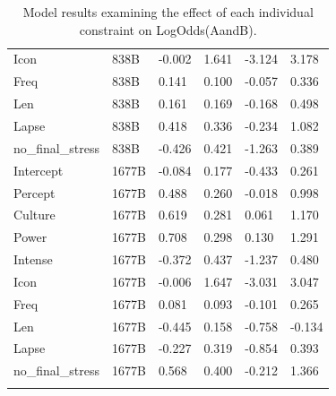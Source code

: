 \documentclass[
  nottoc]{article}
\begin{document}
\begin{longtable}[]{@{}llllll@{}}
Icon & 838B & -0.002 & 1.641 & -3.124 & 3.178 \\
Freq & 838B & 0.141 & 0.100 & -0.057 & 0.336 \\
Len & 838B & 0.161 & 0.169 & -0.168 & 0.498 \\
Lapse & 838B & 0.418 & 0.336 & -0.234 & 1.082 \\
no\_final\_stress & 838B & -0.426 & 0.421 & -1.263 & 0.389 \\
Intercept & 1677B & -0.084 & 0.177 & -0.433 & 0.261 \\
Percept & 1677B & 0.488 & 0.260 & -0.018 & 0.998 \\
Culture & 1677B & 0.619 & 0.281 & 0.061 & 1.170 \\
Power & 1677B & 0.708 & 0.298 & 0.130 & 1.291 \\
Intense & 1677B & -0.372 & 0.437 & -1.237 & 0.480 \\
Icon & 1677B & -0.006 & 1.647 & -3.031 & 3.047 \\
Freq & 1677B & 0.081 & 0.093 & -0.101 & 0.265 \\
Len & 1677B & -0.445 & 0.158 & -0.758 & -0.134 \\
Lapse & 1677B & -0.227 & 0.319 & -0.854 & 0.393 \\
no\_final\_stress & 1677B & 0.568 & 0.400 & -0.212 & 1.366 \\


\caption{\label{tbl-exp2m2}Model results examining the effect of each
individual constraint on LogOdds(AandB).}

\tabularnewline
\end{longtable}
\end{document}
